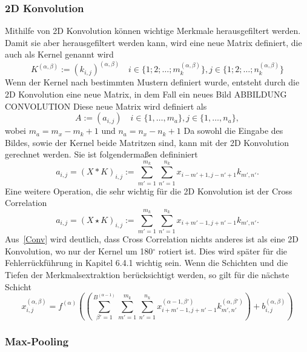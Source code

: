 \documentclass[11pt]{article}
\begin{document}
\subsubsection{2D Konvolution}
Mithilfe von 2D Konvolution können wichtige Merkmale herausgefiltert werden. Damit sie aber herausgefiltert werden kann, wird
eine neue Matrix definiert, die auch als Kernel genannt wird
\begin{equation}
    K^{(\alpha,\beta)}:=(k_{i,j})^{(\alpha,\beta)} \quad i \in\{1;2;\ldots;m_{k}^{(\alpha,\beta)}\}, j \in\{1;2;\ldots;n_{k}^{(\alpha,\beta)}\}
\end{equation}
Wenn der Kernel nach bestimmten Mustern definiert wurde, entsteht durch die 2D Konvolution eine neue Matrix, in dem Fall ein neues Bild
ABBILDUNG CONVOLUTION
Diese neue Matrix wird definiert als 
\begin{equation}
    A := (a_{i,j}) \quad i \in \{1,\ldots,m_{a}\}, j \in \{1,\ldots,n_{a}\},
\end{equation}
wobei $ m_a = m_x - m_k + 1 $ und $ n_a = n_x - n_k + 1 $
Da sowohl die Eingabe des Bildes, sowie der Kernel beide Matritzen sind, kann mit der 2D Konvolution gerechnet werden. Sie ist
folgendermaßen defininiert
\begin{equation}
    a_{i,j} = (X \ast K)_{i,j} := \sum_{m'=1}^{m_{k}} \sum_{n'=1}^{n_{k}} x_{i-m'+1,j-n'+1}k_{m',n'}. \label{Conv}
\end{equation}
Eine weitere Operation, die sehr wichtig für die 2D Konvolution ist der Cross Correlation
\begin{equation}
    a_{i,j} = (X \star K)_{i,j} := \sum_{m'=1}^{m_{k}} \sum_{n'=1}^{n_{k}} x_{i+m'-1,j+n'-1}k_{m',n'}.
\end{equation}
Aus~\eqref{Conv} wird deutlich, dass Cross Correlation nichts anderes ist als eine 2D Konvolution, wo nur der Kernel um 180$^{\circ}$
rotiert ist. Dies wird später für die Fehlerrückführung in Kapitel 6.4.1 wichtig sein. Wenn die Schichten und die Tiefen der
Merkmalsextraktion berücksichtigt werden, so gilt für die nächste Schicht
\begin{equation}
    x_{i,j}^{(\alpha,\beta)} = f^{(\alpha)}((\sum_{\beta'=1}^{B^{(\alpha-1)}} \sum_{m'=1}^{m_{k}} \sum_{n'=1}^{n_{k}} x_{i+m'-1,j+n'-1}^{(\alpha-1,\beta')}k_{m',n'}^{(\alpha,\beta')})+b_{i,j}^{(\alpha,\beta)})
\end{equation}


\subsubsection{Max-Pooling}
\end{document}
